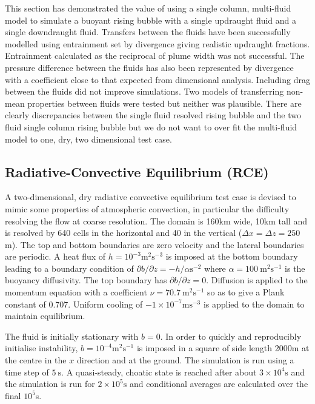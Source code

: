 \documentclass[draft]{agujournal2019}
\begin{document}
This section has demonstrated the value of using a single column,
multi-fluid model to simulate a buoyant rising bubble with a single
updraught fluid and a single downdraught fluid. Transfers between
the fluids have been successfully modelled using entrainment set by
divergence giving realistic updraught fractions. Entrainment calculated
as the reciprocal of plume width was not successful. The pressure
difference between the fluids has also been represented by divergence
with a coefficient close to that expected from dimensional analysis.
Including drag between the fluids did not improve simulations. Two
models of transferring non-mean properties between fluids were tested
but neither was plausible. There are clearly discrepancies between
the single fluid resolved rising bubble and the two fluid single column
rising bubble but we do not want to over fit the multi-fluid model
to one, dry, two dimensional test case.

\subsection{Radiative-Convective Equilibrium (RCE)}

A two-dimensional, dry radiative convective equilibrium test case
is devised to mimic some properties of atmospheric convection, in
particular the difficulty resolving the flow at coarse resolution.
The domain is 160km wide, 10km tall and is resolved by 640 cells in
the horizontal and 40 in the vertical ($\Delta x=\Delta z=250$m).
The top and bottom boundaries are zero velocity and the lateral boundaries
are periodic. A heat flux of $h=10^{-3}\text{m}^{2}\text{s}^{-3}$
is imposed at the bottom boundary leading to a boundary condition
of $\partial b/\partial z=-h/\alpha\text{s}^{-2}$ where $\alpha=100\ \text{m}^{2}\text{s}^{-1}$
is the buoyancy diffusivity. The top boundary has $\partial b/\partial z=0$.
Diffusion is applied to the momentum equation with a coefficient $\nu=70.7\ \text{m}^{2}\text{s}^{-1}$
so as to give a Plank constant of $0.707$. Uniform cooling of $-1\times10^{-7}\text{m}\text{s}^{-3}$
is applied to the domain to maintain equilibrium.

The fluid is initially stationary with $b=0$. In order to quickly
and reproducibly initialise instability, $b=10^{-4}\text{m}^{2}\text{s}^{-1}$
is imposed in a square of side length 2000m at the centre in the $x$
direction and at the ground. The simulation is run using a time step
of $5\ \text{s}$. A quasi-steady, choatic state is reached after
about $3\times10^{4}\text{s}$ and the simulation is run for $2\times10^{5}\text{s}$
and conditional averages are calculated over the final $10^{5}$s.
\end{document}
